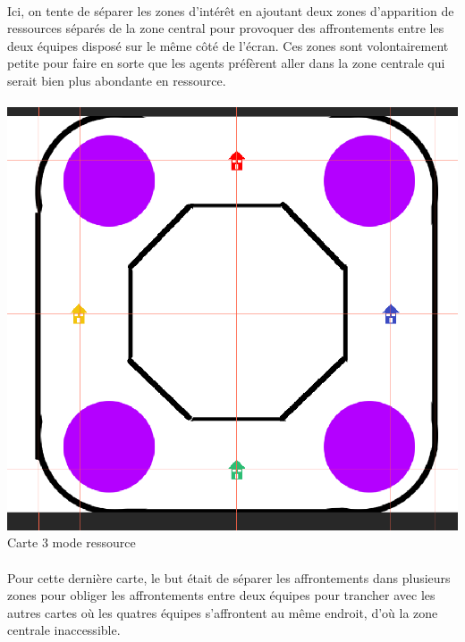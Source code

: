 \documentclass{report}
\begin{document}
\paragraph{}

Ici, on tente de séparer les zones d’intérêt en ajoutant deux zones d’apparition de ressources séparés de la zone central pour provoquer des affrontements entre les deux équipes disposé sur le même côté de l’écran. Ces zones sont volontairement petite pour faire en sorte que les agents préfèrent aller dans la zone centrale qui serait bien plus abondante en ressource.

\paragraph{}
\begin{center}
\includegraphics[scale=0.2]{DATA/carteO.png}
 {Carte 3 mode ressource}
\end{center}
\paragraph{}

Pour cette dernière carte, le but était de séparer les affrontements dans plusieurs zones pour obliger les affrontements entre deux équipes pour trancher avec les autres cartes où les quatres équipes s'affrontent au même endroit, d’où la zone centrale inaccessible.
\end{document}
